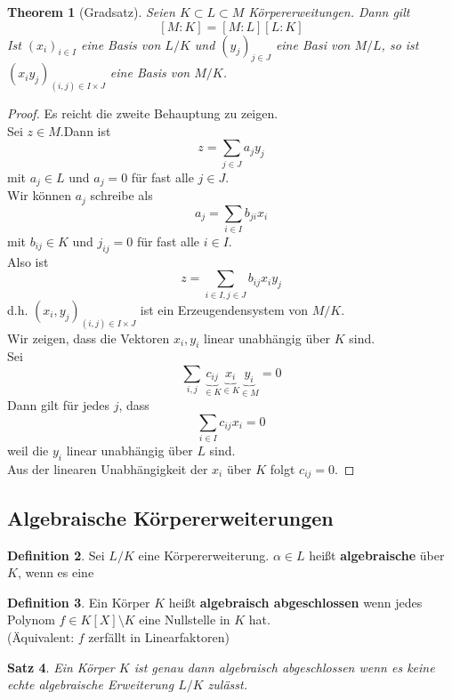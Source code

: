 \documentclass[10pt,a4paper]{article}
\newcommand{\al}{\ensuremath{\alpha}}
\theoremstyle{plain}
\newtheorem{theorem}{Theorem}[section]
\newtheorem{satz}[theorem]{Satz}
\theoremstyle{definition}
\newtheorem{definition}[theorem]{Definition}
\theoremstyle{remark}
\begin{document}
	\begin{theorem}[Gradsatz]
		Seien $K\subset L\subset M$ Körpererweitungen. Dann gilt
		\[[M:K]=[M:L][L:K]\]
		Ist $(x_i)_{i\in I}$ eine Basis von $L/K$ und $(y_j)_{j\in J}$ eine Basi von $M/L$, so ist $(x_iy_j)_{(i,j)\in I\times J}$ eine Basis von $M/K$.
	\end{theorem}
	\begin{proof}
		Es reicht die zweite Behauptung zu zeigen.\\
		Sei $z\in M$.Dann ist
		\[z=\sum_{j\in J}a_jy_j\]
		mit $a_j\in L$ und $a_j=0$ für fast alle $j\in J$.\\
		Wir können $a_j$ schreibe als
		\[a_j=\sum_{i\in I}b_{ji}x_i\]
		mit $b_{ij}\in K$ und $j_{ij}=0$ für fast alle $i\in I$.\\
		Also ist
		\[z=\sum_{i\in I,j\in J}b_{ij}x_iy_j\]
		d.h. $(x_i,y_j)_{(i,j)\in I\times J}$ ist ein Erzeugendensystem von $M/K$.\\
		Wir zeigen, dass die Vektoren $x_i,y_i$ linear unabhängig über $K$ sind.\\
		Sei
		\[\sum_{i,j}\underbrace{c_{ij}}_{\in K}\underbrace{x_i}_{\in K}\underbrace{y_i}_{\in M}=0\]
		Dann gilt für jedes $j$, dass
		\[\sum_{i\in I}c_{ij}x_i=0\]
		weil die $y_i$ linear unabhängig über $L$ sind.\\
		Aus der linearen Unabhängigkeit der $x_i$ über $K$ folgt $c_{ij}=0$.
	\end{proof}

	\subsection{Algebraische Körpererweiterungen}
	\begin{definition}
		Sei $L/K$ eine Körpererweiterung. $\al\in L$ heißt \textbf{algebraische} über $K$, wenn es eine 
	\end{definition}

	\begin{definition}
		Ein Körper $K$ heißt \textbf{algebraisch abgeschlossen} wenn jedes Polynom $f\in K[X]\setminus K$ eine Nullstelle in $K$ hat.\\
		(Äquivalent: $f$ zerfällt in Linearfaktoren)
	\end{definition}

	\begin{satz}
		Ein Körper $K$ ist genau dann algebraisch abgeschlossen wenn es keine echte algebraische Erweiterung $L/K$ zulässt.
	\end{satz}
\end{document}
